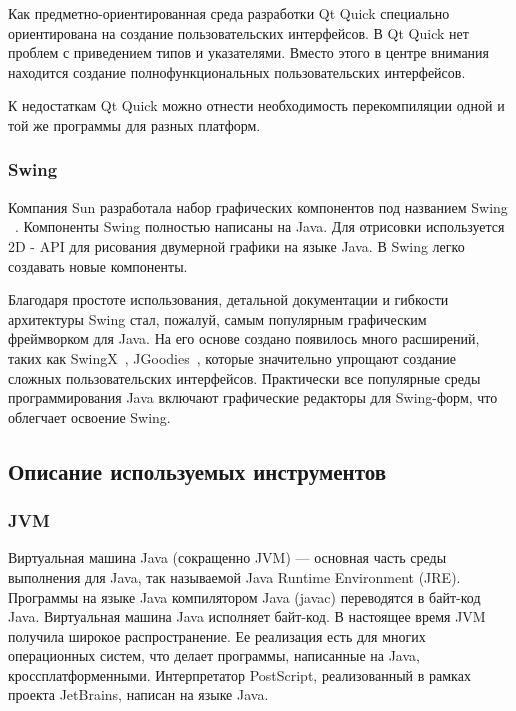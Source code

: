 \documentclass[14pt]{extarticle}
\begin{document}
Как предметно-ориентированная среда разработки Qt Quick специально ориентирована на создание пользовательских интерфейсов. В Qt Quick нет проблем с приведением типов и указателями. Вместо этого в центре внимания находится создание полнофункциональных пользовательских интерфейсов.

К недостаткам Qt Quick можно отнести необходимость перекомпиляции одной и той же программы для разных платформ. 
		 		
		
		\subsubsection*{Swing}
				
				Компания Sun разработала набор графических компонентов под названием Swing ~\cite{swing}. Компоненты Swing полностью написаны на Java. Для отрисовки используется 2D - API для рисования двумерной графики на языке Java. В Swing легко создавать новые компоненты.

Благодаря простоте использования, детальной документации и гибкости архитектуры Swing стал, пожалуй, самым популярным графическим фреймворком для Java. На его основе создано появилось много расширений, таких как SwingX~\cite{swingx}, JGoodies~\cite{jgoodies}, которые значительно упрощают создание сложных пользовательских интерфейсов. Практически все популярные среды программирования Java включают графические редакторы для Swing-форм, что облегчает освоение Swing.
		

		
	
		
		 
	\subsection{Описание используемых инструментов }
		
		\subsubsection*{JVM}
	
		Виртуальная машина Java (сокращенно JVM) --- основная часть среды выполнения для Java, так называемой Java Runtime Environment (JRE). Программы на языке Java компилятором Java (javac) переводятся в байт-код Java. Виртуальная машина Java исполняет байт-код. В настоящее время JVM получила широкое распространение. Ее реализация есть для многих операционных систем, что делает программы, написанные на Java, кроссплатформенными. Интерпретатор PostScript, реализованный в рамках проекта JetBrains, написан на языке Java.
\end{document}
